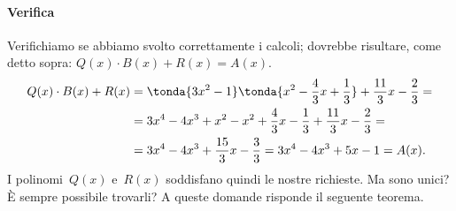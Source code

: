 \begin{esempio}{}{}
\paragraph{Verifica}
Verifichiamo se abbiamo svolto correttamente i calcoli; dovrebbe risultare, 
come detto sopra: \(Q(x)\cdot B(x)+R(x) = A(x)\).
\begin{equation*}
\begin{split}
Q(x)\cdot B(x)+R(x) &= 
\tonda{3x^2-1}\tonda{x^2-\dfrac{4}{3}x+\dfrac{1}{3}}+
\dfrac{11}{3}x-\dfrac{2}{3} =\\ 
&=3x^4-4x^3+x^2-x^2+\dfrac{4}{3}x-
  \dfrac{1}{3}+\dfrac{11}{3}x-\dfrac{2}{3}=\\
&= 3x^4-4x^3+\dfrac{15}{3}x-\dfrac{3}{3}
= 3x^4-4x^3+5x-1 = A(x).
\end{split}
\end{equation*}
I polinomi~\(Q(x)\) e~\(R(x)\) soddisfano quindi le nostre richieste. 
Ma sono unici? È sempre possibile trovarli? 
A queste domande risponde il seguente teorema.
\end{esempio}
